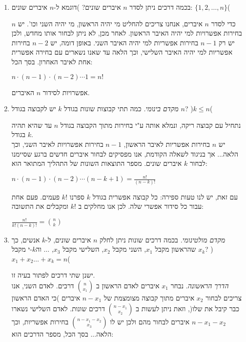 \documentclass[12pt,a4paper]{article}
\begin{document}
\begin{enumerate}[label=\textcolor{BurntOrange}{שאלה \arabic*: }]
\item בכמה דרכים ניתן לסדר $n$ איברים שונים? )דוגמא ל-$n$ איברים שונים: $\{1,2, \ldots ,n \}$(
\begin{Solution}
כדי לסדר $n$ איברים, אנחנו צריכים להחליט מי יהיה הראשון, מי יהיה השני וכו'. יש $n$ בחירות אפשרויות למי יהיה האיבר הראשון. לאחר מכן, לא ניתן לבחור אותו מחדש, ולכן יש רק $n-1$ בחירות אפשריות למי יהיה האיבר השני. באופן דומה, יש $n-2$ בחירות אפשריות למי יהיה האיבר השלישי, וכך הלאה עד שאנו נשארים עם בחירה אפשרית אחת לאיבר האחרון. בסך הכל:
\begin{center}
$n\cdot(n-1)\cdot(n-2) \cdots 1 = n!$
\end{center}
אפשרויות לסידור $n$ האיברים.
\end{Solution}
\item \textit{מקדם בינומי.} כמה תתי קבוצות שונות בגודל $k$ יש לקבוצה בגודל $n$? )$k \leq n$( \\
\begin{Solution}
נתחיל עם קבוצה ריקה, ונמלא אותה ע"י בחירות מתוך הקבוצה בגודל $n$ עד שהיא תהיה בגודל $k$. \\
יש $n$ בחירות אפשריות לאיבר הראשון, $n-1$ בחירות אפשרויות לאיבר השני, וכך הלאה... אך בניגוד לשאלה הקודמת, אנו מפסיקים לבחור איברים חדשים ברגע שסיימנו לבחור $k$ איברים שונים. מספר התוצאות השונות של התהליך המתואר הוא:
\begin{center}
$n\cdot(n-1)\cdot(n-2) \cdots (n-k+1) = \frac{n!}{(n-k)!}$
\end{center}
עם זאת, יש לנו טעות ספירה: כל קבוצה אפשרית בגודל $k$ ספרנו $k!$ פעמים. פעם אחת עבור כל סידור אפשרי שלה. לכן אנו מחלקים ב $k!$ ומקבלים את התשובה:
\begin{center}
$\frac{n!}{k!(n-k)!} = \binom{n}{k}$
\end{center}
\end{Solution}
\item \textit{מקדם מולטינומי.} בכמה דרכים שונות ניתן לחלק $n$ איברים שונים, ל-$k$ אנשים, כך שהראשון מקבל $x_1$, השני מקבל $x_2$, השלישי מקבל $x_3$, $\dots$ וה$k$-י מקבל $x_k$? )$x_1 + x_2 \dots + x_k = n $( 
\begin{Solution}
ישנן שתי דרכים לפתור בעיה זו. \\
\textit{הדרך הראשונה}. נבחר $x_1$ איברים לאדם הראשון ב $\binom{n}{x_1}$ דרכים. לאדם השני, אנו צריכים לבחור $x_2$ איברים מתוך קבוצה מצומצמת של $n-x_1$ איברים )כי האדם הראשון כבר קיבל את שלו(, וזאת ניתן לעשות ב $\binom{n-x_1}{x_2}$ דרכים שונות. לאדם השלישי נשארו $n-x_1-x_2$ איברים לבחור מהם ולכן יש לו $\binom{n-x_1-x_2}{x_3}$ בחירות אפשריות, וכך הלאה... בסך הכל, מספר הדרכים הוא:

\end{Solution}
\end{enumerate}
\end{document}
